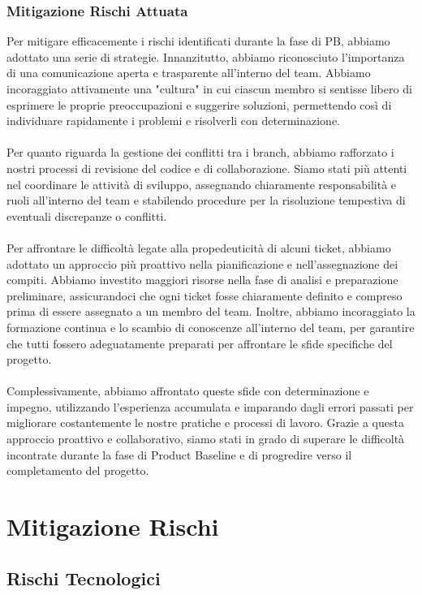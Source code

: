 \documentclass[5pt]{article}
\begin{document}
    \subsubsection{Mitigazione Rischi Attuata}
    Per mitigare efficacemente i rischi identificati durante la fase di PB, abbiamo adottato una serie di strategie. Innanzitutto, abbiamo riconosciuto l'importanza di una comunicazione aperta e trasparente all'interno del team. Abbiamo incoraggiato attivamente una "cultura" in cui ciascun membro si sentisse libero di esprimere le proprie preoccupazioni e suggerire soluzioni, permettendo così di individuare rapidamente i problemi e risolverli con determinazione.\\\\
    Per quanto riguarda la gestione dei conflitti tra i branch, abbiamo rafforzato i nostri processi di revisione del codice e di collaborazione. Siamo stati più attenti nel coordinare le attività di sviluppo, assegnando chiaramente responsabilità e ruoli all'interno del team e stabilendo procedure per la risoluzione tempestiva di eventuali discrepanze o conflitti.\\\\
    Per affrontare le difficoltà legate alla propedeuticità di alcuni ticket, abbiamo adottato un approccio più proattivo nella pianificazione e nell'assegnazione dei compiti. Abbiamo investito maggiori risorse nella fase di analisi e preparazione preliminare, assicurandoci che ogni ticket fosse chiaramente definito e compreso prima di essere assegnato a un membro del team. Inoltre, abbiamo incoraggiato la formazione continua e lo scambio di conoscenze all'interno del team, per garantire che tutti fossero adeguatamente preparati per affrontare le sfide specifiche del progetto.\\\\
    Complessivamente, abbiamo affrontato queste sfide con determinazione e impegno, utilizzando l'esperienza accumulata e imparando dagli errori passati per migliorare costantemente le nostre pratiche e processi di lavoro. Grazie a questa approccio proattivo e collaborativo, siamo stati in grado di superare le difficoltà incontrate durante la fase di Product Baseline e di progredire verso il completamento del progetto.
    

\section{Mitigazione Rischi}

\subsection{Rischi Tecnologici}
\end{document}
